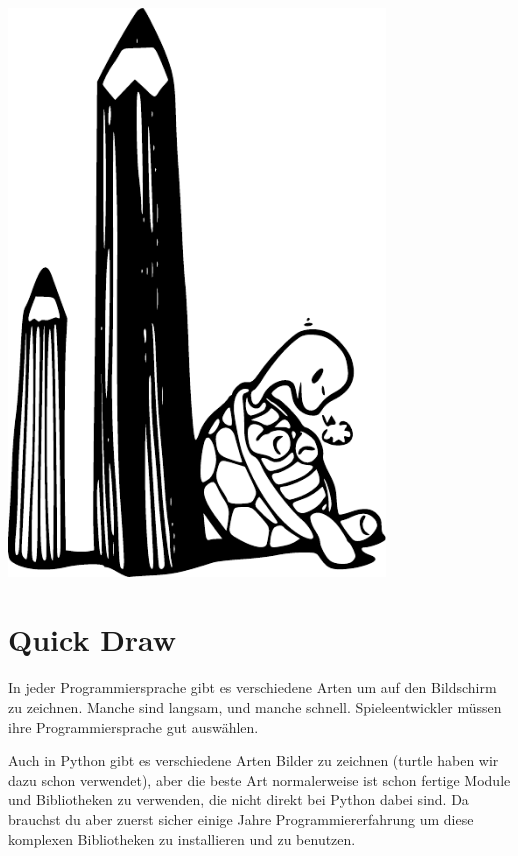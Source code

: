 \begin{center}
\includegraphics*[width=100mm]{images/turtle1}
\end{center}

\section{Quick Draw}

In jeder Programmiersprache gibt es verschiedene Arten um auf den Bildschirm zu zeichnen. Manche sind langsam, und manche schnell. Spieleentwickler müssen ihre Programmiersprache gut auswählen.
\par
Auch in Python gibt es verschiedene Arten Bilder zu zeichnen (turtle haben wir dazu schon verwendet), aber die beste Art normalerweise ist schon fertige Module und Bibliotheken zu verwenden, die nicht direkt bei Python dabei sind. Da brauchst du aber zuerst sicher einige Jahre Programmiererfahrung um diese komplexen Bibliotheken zu installieren und zu benutzen.

